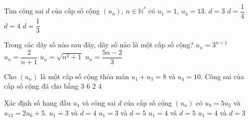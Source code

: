 \begin{ex}%
	Tìm công  sai $d$ của cấp số cộng $(u_n)$, $n \in \mathbb{N}^*$ có $u_1=1$, $u_4=13$.
	 \choice
		 {$d=3$}
		{$d=\dfrac{1}{4}$} 
		{\True  $d=4$}
		{$d=\dfrac{1}{3}$} 
\end{ex}

\begin{ex}%
	Trong các dãy số nào  sau đây, dãy số nào là một cấp số cộng?
	\choice 
		 {$u_n=3^{n+1}$}
		{$u_n=\dfrac{2}{n+1}$} 
		{$u_n=\sqrt{n^2+1}$} 
		{\True  $u_n=\dfrac{5n-2}{3}$}
\end{ex}

\begin{ex}%
	Cho $(u_n)$ là một cấp số cộng thỏa mãn $u_1+u_3=8$ và  $u_4=10$. Công sai của cấp số cộng đã cho bằng
	\choice 
		{\True $3$} 
		{$6$} 
		{$2$} 
		{$4$} 
\end{ex}

\begin{ex}%
	Xác định số hạng đầu $u_1$ và công sai $d$ của cấp  số cộng $(u_n)$ có $u_9=5u_2$ và \\$u_{13}=2u_6+5$.
	 \choice
		{\True $u_1=3$ và $d=4$} 
		 {$u_1=3$ và $d=5$}
		{$u_1=4$  và $d=5$}
		{$u_1=4$ và $d=3$} 
\end{ex}

